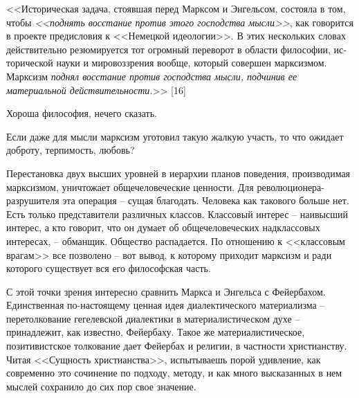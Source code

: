 \documentclass{book}
\begin{document}
<<Историческая задача, стоявшая перед Марксом и Энгельсом, состояла в том, чтобы \textit{<<поднять восстание против этого 
господства мысли>>},  как говорится в проекте предисловия к <<Немецкой идеологии>>. В этих нескольких словах действительно 
резюмируется тот огромный переворот в области философии, ис­торической науки и мировоззрения вообще, который совершен марксизмом. 
Марксизм \textit{поднял восстание против господства мысли, подчинив ее материальной действительности.}>> [16]

Хороша философия, нечего сказать.

Если даже для мысли марксизм уготовил такую жалкую участь, то что ожидает доброту, терпимость, любовь?

Перестановка двух высших уровней в иерархии планов поведения, производимая марксизмом, уничтожает общечеловеческие ценности. Для 
революционера-разрушителя эта операция -- сущая благодать. Человека как такового больше нет. Есть только представители различных 
классов. Классовый интерес -- наивысший интерес, а кто говорит, что он думает об общечеловеческих надклассовых  интересах, -- 
обманщик. Общество распадается. По отношению к <<классовым врагам>> все позволено -- вот вывод, к которому приходит марксизм и 
ради которого существует вся его философская часть.

С этой точки зрения интересно сравнить Маркса и Энгельса с Фейербахом. Единственная по-настоящему ценная идея диалек­тического 
материализма -- перетолкование гегелевской диа­лектики в материалистическом духе -- принадлежит, как извест­но, Фейербаху. Такое же 
материалистическое, позитивистское толкование дает Фейербах и религии, в частности христианству. Читая <<Сущность христианства>>, 
испытываешь порой удивле­ние, как современно это сочинение по подходу, методу, и как много высказанных в нем мыслей сохранило до 
сих пор свое значение.
\end{document}
